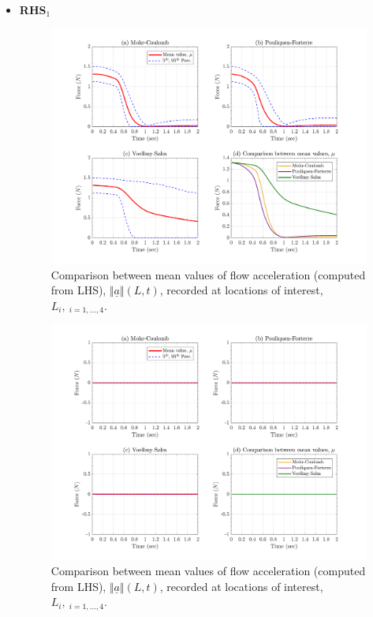 \documentclass{article}
\begin{document}
\begin{itemize}
\newpage
\item	\textbf{RHS$_1$}

\begin{figure}[H]
        \centering
        \includegraphics[width=1\textwidth]{InclinedPlane/Forces_Powers/RHS1/FRHS1x.png}
        \caption{Comparison between mean values of flow acceleration (computed from LHS), $\Vert \underline{a} \Vert(L,t)$, recorded at locations of interest, $L_i, \ _{i=1,...,4}$.}
        \label{fig:Ramp-RHS1-Fx-spatial}
\end{figure}

\begin{figure}[H]
        \centering
        \includegraphics[width=1\textwidth]{InclinedPlane/Forces_Powers/RHS1/FRHS1y.png}
        \caption{Comparison between mean values of flow acceleration (computed from LHS), $\Vert \underline{a} \Vert(L,t)$, recorded at locations of interest, $L_i, \ _{i=1,...,4}$.}
        \label{fig:Ramp-RHS1-Fy-spatial}
\end{figure}


\end{itemize}
\end{document}
